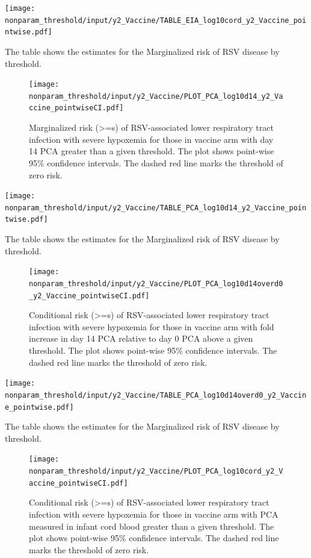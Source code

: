\documentclass[11pt]{article}
\begin{document}
\begin{table}[H]
    \centering
    \texttt{[image: nonparam\_threshold/input/y2\_Vaccine/TABLE\_EIA\_log10cord\_y2\_Vaccine\_pointwise.pdf]}
    \caption{The table shows the  estimates for the Marginalized risk of RSV disease by threshold. }
\end{table}

\begin{figure}[H]
    \centering
    \texttt{[image: nonparam\_threshold/input/y2\_Vaccine/PLOT\_PCA\_log10d14\_y2\_Vaccine\_pointwiseCI.pdf]}
   \caption{Marginalized risk (>=s) of RSV-associated lower respiratory tract infection with severe hypoxemia for those in vaccine arm with day 14 PCA greater than a given threshold. The plot shows point-wise 95\% confidence intervals. The dashed red line marks the threshold of zero risk.}
\end{figure}

\begin{table}[H]
    \centering
    \texttt{[image: nonparam\_threshold/input/y2\_Vaccine/TABLE\_PCA\_log10d14\_y2\_Vaccine\_pointwise.pdf]}
    \caption{The table shows the  estimates for the Marginalized risk of RSV disease by threshold. }
\end{table}

\begin{figure}[H]
    \centering
    \texttt{[image: nonparam\_threshold/input/y2\_Vaccine/PLOT\_PCA\_log10d14overd0\_y2\_Vaccine\_pointwiseCI.pdf]}
    \caption{Conditional risk (>=s) of RSV-associated lower respiratory tract infection with severe hypoxemia for those in vaccine arm with fold increase in day 14 PCA relative to day 0 PCA above a given threshold. The plot shows point-wise 95\% confidence intervals. The dashed red line marks the threshold of zero risk.}
     \label{fig:PLOT_PCA_log10d14overd0_y2_Vaccine_pointwiseCI}
\end{figure}

\begin{table}[H]
    \centering
    \texttt{[image: nonparam\_threshold/input/y2\_Vaccine/TABLE\_PCA\_log10d14overd0\_y2\_Vaccine\_pointwise.pdf]}
    \caption{The table shows the  estimates for the Marginalized risk of RSV disease by threshold. }
\end{table}

\begin{figure}[H]
    \centering
    \texttt{[image: nonparam\_threshold/input/y2\_Vaccine/PLOT\_PCA\_log10cord\_y2\_Vaccine\_pointwiseCI.pdf]}
   \caption{Conditional risk (>=s) of RSV-associated lower respiratory tract infection with severe hypoxemia for those in vaccine arm with PCA measured in infant cord blood greater than a given threshold. The plot shows point-wise 95\% confidence intervals. The dashed red line marks the threshold of zero risk.}
\end{figure}
\end{document}
